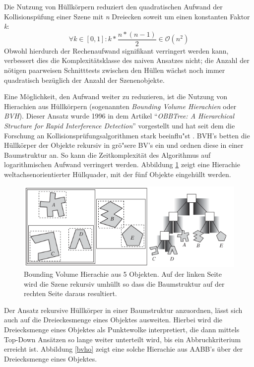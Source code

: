 Die Nutzung von H\"ullk\"orpern reduziert den quadratischen Aufwand der Kollisionsp\"ufung einer Szene mit {\em n} Dreiecken soweit um einen konstanten Faktor {\em k}:
\begin{equation}
\forall k \in [0,1]:
k* \frac{n*(n-1)}{2} 
\in \mathcal O(n^2)
\end{equation}
Obwohl hierdurch der Rechenaufwand signifikant verringert werden kann, verbessert dies die Komplexit\"atsklasse des naiven Ansatzes nicht; die Anzahl der n\"otigen paarweisen Schnitttests zwischen den H\"ullen w\"achst noch immer
quadratisch bez\"uglich der Anzahl der Szenenobjekte.

Eine M\"oglichkeit, den Aufwand weiter zu reduzieren, ist die Nutzung von Hierachien aus H\"ullk\"orpern (sogenannten {\em Bounding Volume Hierachien} oder {\em BVH}). Dieser Ansatz wurde 1996 in dem Artikel "`{\em OBBTree: A Hierarchical Structure for Rapid Interference Detection}"' vorgestellt und hat seit dem die Forschung an Kollisionspr\"ufungsalgorithmen stark beeinflu"st \cite{Gottschalk}. BVH's betten die H\"ullk\"orper der Objekte rekursiv in gr\"o"sere BV's ein und ordnen diese in einer Baumstruktur an. So kann die Zeitkomplexit\"at des Algorithmus auf logarithmischen Aufwand verringert werden. Abbildung \ref{bvh} zeigt eine Hierachie weltachsenorientierter H\"ullquader, mit der f\"unf Objekte eingeh\"ullt werden.

\begin{figure}[H]
\centerline{
	\includegraphics[scale=0.60]{graphics/bvh.png}
}
\caption{Bounding Volume Hierachie aus 5 Objekten. Auf der linken Seite wird
die Szene rekursiv umh\"ullt so dass die Baumstruktur auf der rechten Seite
daraus resultiert. }
\label{bvh}
\end{figure}

Der Ansatz rekursive H\"ullk\"orper in einer Baumstruktur anzuordnen, l\"asst
sich auch auf die Dreieckesmenge eines Objektes ausweiten. Hierbei wird die
Dreiecksmenge eines Objektes als Punktewolke interpretiert, die dann mittels
Top-Down Ans\"atzen so lange weiter unterteilt wird, bis ein Abbruchkriterium
erreicht ist. Abbildung \ref{bvho} zeigt eine solche Hierachie aus AABB's \"uber
der Dreiecksmenge eines Objektes.

